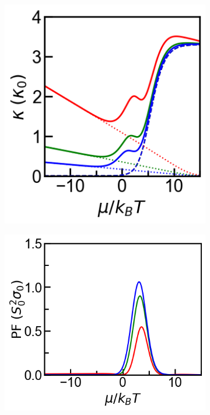 \documentclass{article}
\begin{document}
\begin{figure}[ht]
\begin{subfigure}[b]{0.33\textwidth}
\end{subfigure}
\begin{subfigure}[b]{0.33\textwidth}
  \includegraphics[width=\textwidth]{../Thermal.png}
\end{subfigure}
\begin{subfigure}[b]{0.33\textwidth}
  \includegraphics[width=\textwidth]{../PF.png}

\end{subfigure}
\end{figure}
\end{document}
